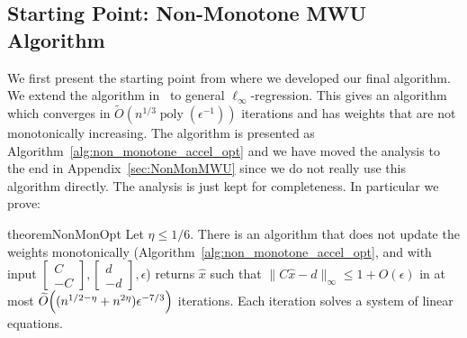 \documentclass[11pt]{article}
\let\originalleft\left
\let\originalright\right
\renewcommand{\left}{\mathopen{}\mathclose\bgroup\originalleft}
\renewcommand{\right}{\aftergroup\egroup\originalright}
\newcommand\dd{\boldsymbol{\mathit{d}}}
\newcommand\xx{\boldsymbol{\mathit{x}}}
\newcommand\CC{\boldsymbol{\mathit{C}}}
\newcommand\xxhat{\widehat{\xx}}
\newcommand{\wt}{\widetilde}
\DeclareMathOperator*{\poly}{{\mathrm{poly}}}
\begin{document}
\subsection{Starting Point: Non-Monotone MWU Algorithm}
We first present the starting point from where we developed our final algorithm. We extend the algorithm in~\cite{madry2016computing} to general $\ell_{\infty}$-regression. This gives an algorithm which converges in $\wt{O}(n^{1/3} \poly(\epsilon^{-1}))$ iterations and has weights that are not monotonically increasing. The algorithm is presented as Algorithm~\ref{alg:non_monotone_accel_opt} and we have moved the analysis to the end in Appendix~\ref{sec:NonMonMWU} since we do not really use this algorithm directly. The analysis is just kept for completeness. In particular we prove:

\begin{restatable}{theorem}{NonMonOpt}\label{thm:NonMonotoneMWUAcc}
Let $\eta \leq 1/6$. There is an algorithm that does not update the weights monotonically (Algorithm~\ref{alg:non_monotone_accel_opt}, and with input $\begin{bmatrix}
    \CC\\ -\CC
\end{bmatrix}, \begin{bmatrix}
    \dd\\ -\dd
\end{bmatrix}, \epsilon$) returns $\xxhat$ such that $\|\CC\xxhat-\dd\|_{\infty}\leq 1+O(\epsilon)$ in at most $\widetilde{O}\left((n^{1/2-\eta} + n^{2\eta})\epsilon^{-7/3}\right)$ iterations. Each iteration solves a system of linear equations.
\end{restatable}
\end{document}
